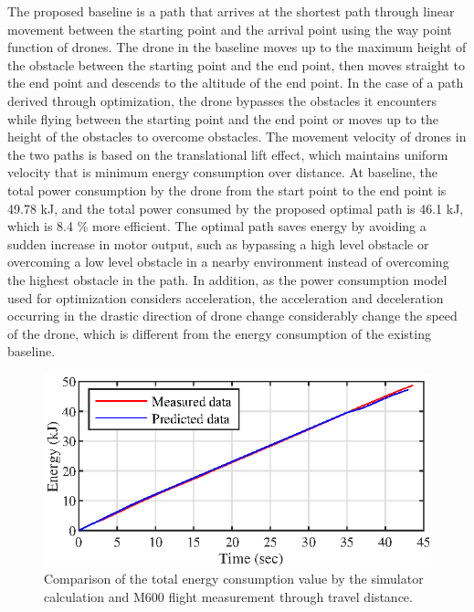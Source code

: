 \documentclass[journal]{./template/IEEEtran}
\begin{document}
The proposed baseline is a path that arrives at the shortest path through linear movement between the starting point and the arrival point using the way point function of drones. The drone in the baseline moves up to the maximum height of the obstacle between the starting point and the end point, then moves straight to the end point and descends to the altitude of the end point. 
In the case of a path derived through optimization, the drone bypasses the obstacles it encounters while flying between the starting point and the end point or moves up to the height of the obstacles to overcome obstacles. 
The movement velocity of drones in the two paths is based on the translational lift effect, which maintains uniform velocity that is minimum energy consumption over distance. 
At baseline, the total power consumption by the drone from the start point to the end point is 49.78 kJ, and the total power consumed by the proposed optimal path is 46.1 kJ, which is 8.4 \% more efficient. The optimal path saves energy by avoiding a sudden increase in motor output, such as bypassing a high level obstacle or overcoming a low level obstacle in a nearby environment instead of overcoming the highest obstacle in the path.
In addition, as the power consumption model used for optimization considers acceleration, the acceleration and deceleration occurring in the drastic direction of drone change considerably change the speed of the drone, which is different from the energy consumption of the existing baseline.

\begin{figure}[ht]
\centering\includegraphics[scale=1.0]{fig14/S_E.eps}
\caption{Comparison of the total energy consumption value by the simulator calculation and M600 flight measurement through travel distance.}
\label{fig:consumed_energy}
\end{figure}
\end{document}
